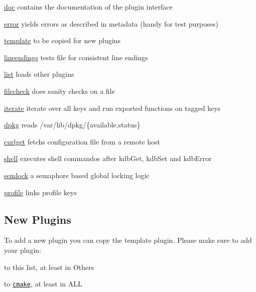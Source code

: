 \begin{DoxyItemize}
\item \hyperlink{md_src_plugins_doc_README_src_plugins_doc_README_md}{doc} contains the documentation of the plugin interface
\item \hyperlink{md_src_plugins_error_README_src_plugins_error_README_md}{error} yields errors as described in metadata (handy for test purposes)
\item \hyperlink{md_src_plugins_template_README_src_plugins_template_README_md}{template} to be copied for new plugins
\item \hyperlink{md_src_plugins_lineendings_README_src_plugins_lineendings_README_md}{lineendings} tests file for consistent line endings
\item \hyperlink{md_src_plugins_list_README_src_plugins_list_README_md}{list} loads other plugins
\item \hyperlink{md_src_plugins_filecheck_README_src_plugins_filecheck_README_md}{filecheck} does sanity checks on a file
\item \hyperlink{md_src_plugins_iterate_README_src_plugins_iterate_README_md}{iterate} iterate over all keys and run exported functions on tagged keys
\item \hyperlink{md_src_plugins_dpkg_README_src_plugins_dpkg_README_md}{dpkg} reads /var/lib/dpkg/\{available,status\}
\item \hyperlink{md_src_plugins_curlget_README_src_plugins_curlget_README_md}{curlget} fetchs configuration file from a remote host
\item \hyperlink{md_src_plugins_shell_README_src_plugins_shell_README_md}{shell} executes shell commandos after kdb\+Get, kdb\+Set and kdb\+Error
\item \hyperlink{md_src_plugins_semlock_README_src_plugins_semlock_README_md}{semlock} a semaphore based global locking logic
\item \hyperlink{md_src_plugins_profile_README_src_plugins_profile_README_md}{profile} links profile keys
\end{DoxyItemize}

\subsection*{New Plugins}

To add a new plugin you can copy the template plugin. Please make sure to add your plugin\+:


\begin{DoxyItemize}
\item to this list, at least in Others
\item to \href{/home/markus/Projekte/Elektra/current/cmake/ElektraCache.cmake}{\tt cmake}, at least in A\+L\+L 
\end{DoxyItemize}